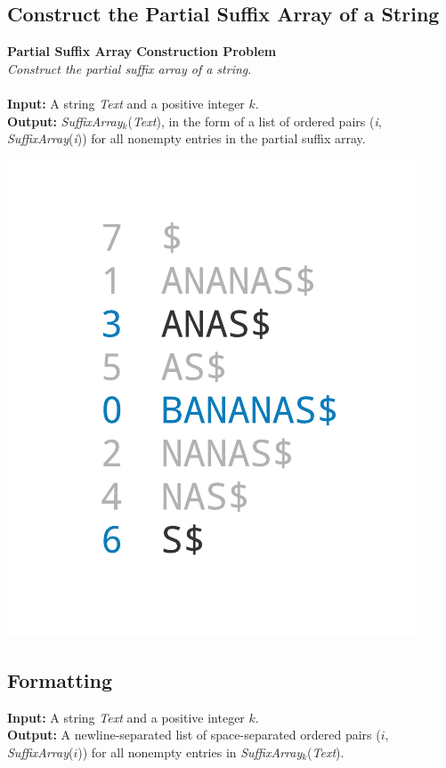 \documentclass{article}
\begin{document}
\subsection{Construct the Partial Suffix Array of a String}
\hline\vspace{5}
\noindent \textbf{Partial Suffix Array Construction Problem}\\
\emph{Construct the partial suffix array of a string}.\\ \\
\textbf{Input:} A string \emph{Text} and a positive integer $k$.\\
\textbf{Output:} \emph{SuffixArray}$_k$(\emph{Text}), in the form of a list of ordered pairs (\emph{i}, \emph{SuffixArray}(\emph{i})) for all nonempty entries in the partial suffix array.
\begin{center}
    \includegraphics[scale=0.2]{c9/logos/9Q.png} 
\end{center}
\hline\vspace{5}

\subsection*{Formatting}
\textbf{Input:} A string \emph{Text} and a positive integer $k$.\\
\noindent \textbf{Output:} A newline-separated list of space-separated ordered pairs ($i$, \emph{SuffixArray}($i$)) for all nonempty entries in \emph{SuffixArray}$_k$(\emph{Text}).
\end{document}
